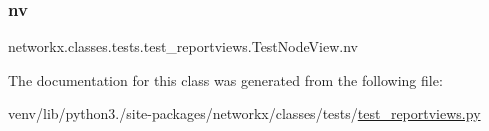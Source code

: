 \subsubsection{\texorpdfstring{nv}{nv}}
{\footnotesize\ttfamily networkx.\+classes.\+tests.\+test\+\_\+reportviews.\+Test\+Node\+View.\+nv}



The documentation for this class was generated from the following file\+:\begin{DoxyCompactItemize}
\item 
venv/lib/python3./site-\/packages/networkx/classes/tests/\hyperlink{test__reportviews_8py}{test\+\_\+reportviews.\+py}\end{DoxyCompactItemize}
